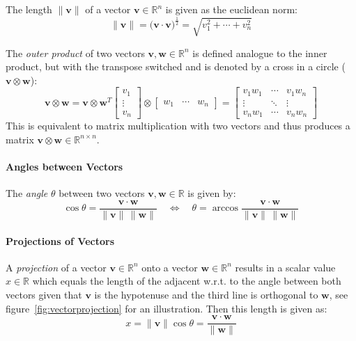 \documentclass[a4paper, 11pt, accentcolor = tud3b]{tudreport}
\newcommand{\norm}[1]{\ensuremath{\lVert #1 \rVert}}
\newcommand{\R}{\ensuremath{\mathbb{R}}}
\renewcommand{\vec}[1]{\mathbf{#1}}
\begin{document}
				The length \( \norm{\vec{v}} \) of a vector \( \vec{v} \in \R^n \) is given as the euclidean norm:
				\begin{equation*}
					\norm{\vec{v}} = \big(\vec{v} \cdot \vec{v}\big)^\frac{1}{2} = \sqrt{v_1^2 + \cdots + v_n^2}
				\end{equation*}

				The \emph{outer product} of two vectors \( \vec{v}, \vec{w} \in \R^n \) is defined analogue to the inner product, but with the transpose switched and is denoted by a cross in a circle (\( \vec{v} \otimes \vec{w} \)):
				\begin{equation}
					\vec{v} \otimes \vec{w} = \vec{v} \otimes \vec{w}^T
						\begin{bmatrix}
							v_1 \\
							\vdots \\
							v_n
						\end{bmatrix}
					\otimes
						\begin{bmatrix}
							w_1 & \cdots & w_n
						\end{bmatrix}
					=
						\begin{bmatrix}
							v_1 w_1 & \cdots & v_1 w_n \\
							\vdots  & \ddots & \vdots  \\
							v_n w_1 & \cdots & v_n w_n
						\end{bmatrix}
				\end{equation}
				This is equivalent to matrix multiplication with two vectors and thus produces a matrix \( \vec{v} \otimes \vec{w} \in \R^{n \times n} \).

			\paragraph{Angles between Vectors}
				The \emph{angle} \(\theta\) between two vectors \( \vec{v}, \vec{w} \in \R \) is given by:
				\begin{equation}
					\cos \theta = \frac{\vec{v} \cdot \vec{w}}{\norm{\vec{v}} \, \norm{\vec{w}}} \quad\iff\quad \theta = \arccos \frac{\vec{v} \cdot \vec{w}}{\norm{\vec{v}} \, \norm{\vec{w}}}
				\end{equation}

			\paragraph{Projections of Vectors}
				A \emph{projection} of a vector \( \vec{v} \in \R^n \) onto a vector \( \vec{w} \in \R^n \) results in a scalar value \( x \in \R \) which equals the length of the adjacent w.r.t. to the angle between both vectors given that \( \vec{v} \) is the hypotenuse and the third line is orthogonal to \( \vec{w} \), see figure~\ref{fig:vectorprojection} for an illustration. Then this length is given as:
				\begin{equation}
					x = \norm{\vec{v}} \cos \theta = \frac{\vec{v} \cdot \vec{w}}{\norm{\vec{w}}}
				\end{equation}
\end{document}
